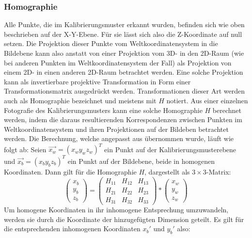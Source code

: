 \subsubsection{Homographie}
Alle Punkte, die im Kalibrierungsmuster erkannt wurden, befinden sich wie oben beschrieben auf der X-Y-Ebene. Für sie lässt sich also die Z-Koordinate auf null setzen. Die Projektion dieser Punkte vom Weltkoordinatensystem in die Bildebene kann also anstatt von einer Projektion vom 3D- in den 2D-Raum (wie bei anderen Punkten im Weltkoordinatensystem der Fall) als Projektion von einem 2D- in einen anderen 2D-Raum betrachtet werden. Eine solche Projektion kann als invertierbare projektive Transformation in Form einer Transformationsmatrix ausgedrückt werden. Transformationen dieser Art werden auch als Homographie bezeichnet und meistens mit \(H\) notiert. Aus einer einzelnen Fotografie des Kalibrierungsmusters kann eine solche Homographie \(H\) berechnet werden, indem die daraus resultierenden Korrespondenzen zwischen Punkten im Weltkoordinatensystem und ihren Projektionen auf der Bildeben betrachtet werden. Die Berechnung, welche angepasst aus \cite{Kriegman:07} übernommen wurde, läuft wie folgt ab:
\newline
Seien \(\vec{x_w} = \left(x_w y_w z_w\right)^{T}\) ein Punkt auf der Kalibrierungsmusterebene und \(\vec{x_b} = \left(x_b y_b z_b\right)^{T}\) ein Punkt auf der Bildebene, beide in homogenen Koordinaten. Dann gilt für die Homographie \(H\), dargestellt als \(3\times 3\)-Matrix:
\begin{equation}
\label{equ:homographie1}
	\left(\begin{array}{c}x_b\\y_b\\z_b\end{array}\right) =  \begin{pmatrix}
			H_{11} & H_{12} & H_{13} \\
			H_{21} & H_{22} & H_{23} \\
			H_{31} & H_{32} & H_{33}
		\end{pmatrix} * \left(\begin{array}{c}x_w\\y_w\\z_w\end{array}\right)
\end{equation}
Um homogene Koordinaten in ihr inhomogene Entsprechung umzuwandeln, werden sie durch die Koordinate der hinzugefügten Dimension geteilt. Es gilt für die entsprechenden inhomogenen Koordinaten \(x_b\prime\) und \(y_b\prime\) also:
